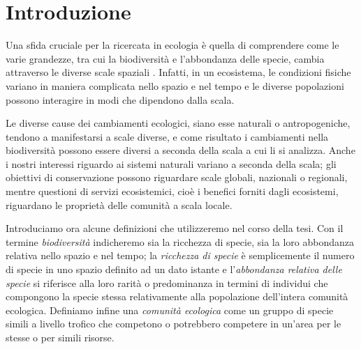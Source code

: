 \chapter*{Introduzione}
Una sfida cruciale per la ricercata in ecologia è quella di comprendere come le varie grandezze, tra cui la biodiversità e l'abbondanza delle specie, cambia attraverso le diverse scale spaziali \cite{doi:10.1111/2041-210X.12319}. Infatti, in un ecosistema, le condizioni fisiche variano in maniera complicata nello spazio e nel tempo e le diverse popolazioni possono interagire in modi che dipendono dalla scala.

Le diverse cause dei cambiamenti ecologici, siano esse naturali o antropogeniche, tendono a manifestarsi a scale diverse, e come risultato i cambiamenti nella biodiversità possono essere diversi a seconda della scala a cui li si analizza. Anche i nostri interessi riguardo ai sistemi naturali variano a seconda della scala; gli obiettivi di conservazione possono riguardare scale globali, nazionali o regionali, mentre questioni di servizi ecosistemici, cioè i benefici forniti dagli ecosistemi, riguardano le proprietà delle comunità a scala locale.

Introduciamo ora alcune definizioni che utilizzeremo nel corso della tesi. Con il termine \emph{biodiversità} indicheremo sia la ricchezza di specie, sia la loro abbondanza relativa nello spazio e nel tempo; la \emph{ricchezza di specie} è semplicemente il numero di specie in uno spazio definito ad un dato istante e l'\emph{abbondanza relativa delle specie} si riferisce alla loro rarità o predominanza in termini di individui che compongono la specie stessa relativamente alla popolazione dell'intera comunità ecologica. Definiamo infine una \emph{comunità ecologica} come un gruppo di specie simili a livello trofico che competono o potrebbero competere in un'area per le stesse o per simili risorse. 
 
